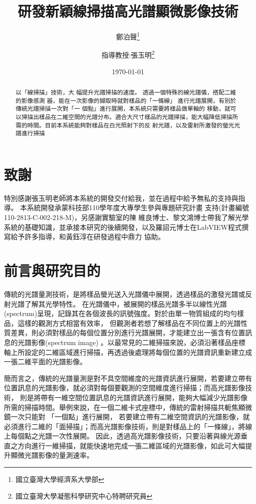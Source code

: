 \documentclass[12pt]{article}
\title{研發新穎線掃描高光譜顯微影像技術}
\author{鄭泊聲\thanks{國立臺灣大學經濟系大學部}
\and 指導教授:張玉明\thanks{國立臺灣大學凝態科學研究中心特聘研究員}}
\date{\today}
\begin{document}
\maketitle
\begin{abstract}
    以「線掃描」技術，大
    幅提升光譜掃描的速度。
    透過一個特殊的線光譜儀，搭配二維的影像感測
    器，能在一次影像的擷取時就對樣品的「一條線」
    進行光譜展開，有別於傳統光譜掃描一次對「一
    個點」進行展開，本系統只需要將樣品做單軸的
    移動，就可以掃描出樣品在二維空間的光譜分布。適合大尺寸樣品的光譜掃描，能大幅降低掃描所需的時間。目前本系統能夠對樣品在白光照射下的反
    射光譜，以及雷射所激發的螢光光譜進行掃描
\end{abstract}
\section*{致謝}
特別感謝張玉明老師將本系統的開發交付給我，並在過程中給予無私的支持與指導。
本系統開發承蒙科技部110學年度大專學生參與專題研究計畫
支持(計畫編號110-2813-C-002-218-M)，另感謝實驗室的陳
維良博士、黎文鴻博士帶我了解光學系統的基礎知識，並承接本研究的後續開發，以及羅詔元博士在LabVIEW程式撰寫給予許多指導，和黃鈺淳在研發過程中鼎力
協助。
\tableofcontents
\listoffigures
\listoftables
\section{前言與研究目的}
傳統的光譜量測技術，是將樣品螢光送入光譜儀中展開，透過樣品的激發光譜或反射光譜了解其光學特性。
在光譜儀中，被展開的樣品光譜多半以線性光譜(spectrum)呈現，記錄其在各個波長的訊號強度。對於由單一物質組成的均勻樣品，這樣的觀測方式相當有效率，
但觀測者若想了解樣品在不同位置上的光譜性質差異，則必須對樣品的每個位置分別進行光譜展開，才能建立出一張含有位置訊息的光譜影像(spectrum image)
。以最常見的二維掃描來說，必須沿著樣品座標軸上所設定的二維區域進行掃描，再透過後處理將每個位置的光譜資訊重新建立成一張二維平面的光譜影像。

簡而言之，傳統的光譜量測是對不具空間維度的光譜資訊進行展開，若要建立帶有位置訊息的光譜影像，就必須對每個要觀測的空間維度進行掃描；而高光譜影像技術，
則是將帶有一維空間位置訊息的光譜資訊進行展開，能夠大幅減少光譜影像所需的掃描時間。舉例來說，在一個二維卡式座標中，傳統的雷射掃描共軛焦顯微鏡一次只能對
「一個點」進行展開，
若要建立帶有二維空間資訊的光譜影像，就必須進行二維的「面掃描」；而高光譜影像技術，則是對樣品上的「一條線」，將線上每個點之光譜一次性展開。
因此，透過高光譜影像技術，只要沿著與線光源垂直之方向進行一維掃描，就能快速地完成一張二維區域的光譜影像，如此可大幅提升顯微光譜影像的量測速率。
\end{document}
